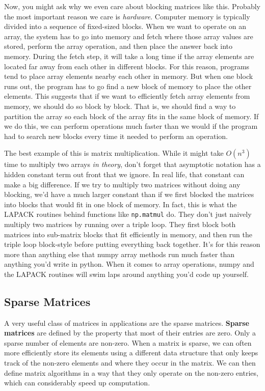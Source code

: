 \documentclass[
  letterpaper,
  DIV=11,
  numbers=noendperiod]{scrreprt}
\begin{document}
Now, you might ask why we even care about blocking matrices like this.
Probably the most important reason we care is \emph{hardware}. Computer
memory is typically divided into a sequence of fixed-sized blocks. When
we want to operate on an array, the system has to go into memory and
fetch where those array values are stored, perform the array operation,
and then place the answer back into memory. During the fetch step, it
will take a long time if the array elements are located far away from
each other in different blocks. For this reason, programs tend to place
array elements nearby each other in memory. But when one block runs out,
the program has to go find a new block of memory to place the other
elements. This suggests that if we want to efficiently fetch array
elements from memory, we should do so block by block. That is, we should
find a way to partition the array so each block of the array fits in the
same block of memory. If we do this, we can perform operations much
faster than we would if the program had to search new blocks every time
it needed to perform an operation.

The best example of this is matrix multiplication. While it might take
\(O(n^3)\) time to multiply two arrays \emph{in theory}, don't forget
that asymptotic notation has a hidden constant term out front that we
ignore. In real life, that constant can make a big difference. If we try
to multiply two matrices without doing any blocking, we'd have a much
larger constant than if we first blocked the matrices into blocks that
would fit in one block of memory. In fact, this is what the LAPACK
routines behind functions like \texttt{np.matmul} do. They don't just
naively multiply two matrices by running over a triple loop. They first
block both matrices into sub-matrix blocks that fit efficiently in
memory, and then run the triple loop block-style before putting
everything back together. It's for this reason more than anything else
that numpy array methods run much faster than anything you'd write in
python. When it comes to array operations, numpy and the LAPACK routines
will swim laps around anything you'd code up yourself.

\hypertarget{sparse-matrices}{%
\subsection{Sparse Matrices}\label{sparse-matrices}}

A very useful class of matrices in applications are the sparse matrices.
\textbf{Sparse matrices} are defined by the property that most of their
entries are zero. Only a sparse number of elements are non-zero. When a
matrix is sparse, we can often more efficiently store its elements using
a different data structure that only keeps track of the non-zero
elements and where they occur in the matrix. We can then define matrix
algorithms in a way that they only operate on the non-zero entries,
which can considerably speed up computation.
\end{document}
